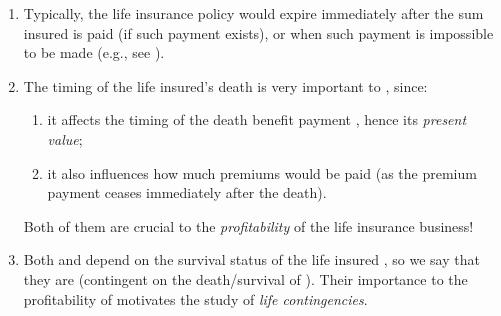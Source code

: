 \begin{enumerate}
\begin{note}
From this we can observe a potential issue: if the death of 
causes no harm to  at all, then the policy may \emph{incentivize}
 to \textcolor{red}{\emph{kill}} ! To deal with this
problem, the underwriting process would ensure the policy  is only
sold to  that has , i.e., the death of the
life insured  should make the policyholder  quite worse
off.\footnote{Expressing differently, it is of interest to  when
 is alive --- survival of  gives some benefits to
.}
\end{note}

\item Typically, the life insurance policy would expire immediately after
the sum insured is paid (if such payment exists), or when such payment is
impossible to be made (e.g., see ).

\item The timing of the life insured's death  is very important to
, since:
\begin{enumerate}
\item it affects the timing of the death benefit payment
, hence its \emph{present value};

\item it also influences how much premiums  would be paid
(as the premium payment ceases immediately after the death).
\end{enumerate}
Both of them are crucial to the \emph{profitability}  of the
life insurance business!

\item Both  and  depend on the
survival status of the life insured , so we say that they are
 (contingent on the death/survival of ).
Their importance to the profitability of  motivates the study
of \emph{life contingencies}.
\end{enumerate}

